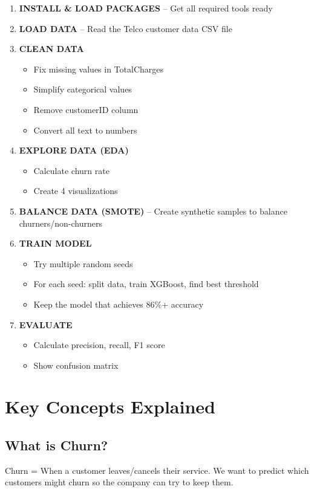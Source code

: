 \documentclass[12pt,a4paper]{article}
\begin{document}
\begin{enumerate}
    \item \textbf{INSTALL \& LOAD PACKAGES} -- Get all required tools ready
    \item \textbf{LOAD DATA} -- Read the Telco customer data CSV file
    \item \textbf{CLEAN DATA}
    \begin{itemize}
        \item Fix missing values in TotalCharges
        \item Simplify categorical values
        \item Remove customerID column
        \item Convert all text to numbers
    \end{itemize}
    \item \textbf{EXPLORE DATA (EDA)}
    \begin{itemize}
        \item Calculate churn rate
        \item Create 4 visualizations
    \end{itemize}
    \item \textbf{BALANCE DATA (SMOTE)} -- Create synthetic samples to balance churners/non-churners
    \item \textbf{TRAIN MODEL}
    \begin{itemize}
        \item Try multiple random seeds
        \item For each seed: split data, train XGBoost, find best threshold
        \item Keep the model that achieves 86\%+ accuracy
    \end{itemize}
    \item \textbf{EVALUATE}
    \begin{itemize}
        \item Calculate precision, recall, F1 score
        \item Show confusion matrix
    \end{itemize}
\end{enumerate}

\section{Key Concepts Explained}

\subsection{What is Churn?}
Churn = When a customer leaves/cancels their service. We want to predict which customers might churn so the company can try to keep them.
\end{document}

